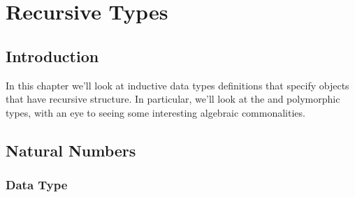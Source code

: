 \documentclass[letterpaper,10pt,english]{sphinxmanual}
\begin{document}
\sphinxstepscope


\chapter{Recursive Types}
\label{\detokenize{A_03_Recursive_Types:recursive-types}}\label{\detokenize{A_03_Recursive_Types:introduction}}\label{\detokenize{A_03_Recursive_Types::doc}}

\section{Introduction}
\label{\detokenize{A_03_Recursive_Types:id1}}
\sphinxAtStartPar
In this chapter we’ll look at inductive data types
definitions that specify objects that have recursive
structure. In particular, we’ll look at the  and
polymorphic  types, with an eye to seeing some
interesting algebraic commonalities.


\section{Natural Numbers}
\label{\detokenize{A_03_Recursive_Types:natural-numbers}}

\subsection{Data Type}
\label{\detokenize{A_03_Recursive_Types:data-type}}
\begin{sphinxVerbatim}[commandchars=\\\{\}]
 
\end{sphinxVerbatim}

\begin{sphinxVerbatim}[commandchars=\\\{\}]
       
    
\end{sphinxVerbatim}
\end{document}
